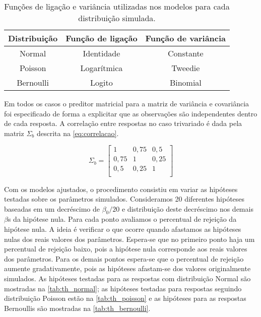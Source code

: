 \begin{table}[H]
\centering
\begin{tabular}{ccc}
\hline
Distribuição & Função de ligação & Função de variância \\ \hline
Normal       & Identidade        & Constante           \\
Poisson      & Logarítmica       & Tweedie             \\
Bernoulli    & Logito            & Binomial            \\ \hline
\end{tabular}
\caption{Funções de ligação e variância utilizadas nos modelos para cada distribuição simulada.}
\label{tab:link_var}
\end{table}

Em todos os casos o preditor matricial para a matriz de variância e covariância foi especificado de forma a explicitar que as observações são independentes dentro de cada resposta. A correlação entre respostas no caso trivariado é dada pela matriz $\Sigma_b$ descrita na \autoref{eq:correlacao}.

\begin{equation} \label{eq:correlacao}
\Sigma_b = 
\begin{bmatrix}
1    & 0,75 & 0,5  \\
0,75 & 1    & 0,25 \\
0,5  & 0,25 & 1    \\
\end{bmatrix}
\end{equation}

Com os modelos ajustados, o procedimento consistiu em variar as hipóteses testadas sobre os parâmetros simulados. Consideramos 20 diferentes hipóteses baseadas em um decréscimo de $\beta_0/20$ e distribuição deste decréscimo nos demais $\beta$s da hipótese nula. Para cada ponto avaliamos o percentual de rejeição da hipótese nula. A ideia é verificar o que ocorre quando afastamos as hipóteses nulas dos reais valores dos parâmetros. Espera-se que no primeiro ponto haja um percentual de rejeição baixo, pois a hipótese nula corresponde aos reais valores dos parâmetros. Para os demais pontos espera-se que o percentual de rejeição aumente gradativamente, pois as hipóteses afastam-se dos valores originalmente simulados. As hipóteses testadas para as respostas com distribuição Normal são mostradas na \autoref{tab:th_normal}; as hipóteses testadas para respostas seguindo distribuição Poisson estão na \autoref{tab:th_poisson} e as hipóteses para as respostas Bernoullis são mostradas na \autoref{tab:th_bernoulli}.

